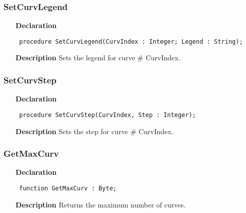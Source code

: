 \documentclass[12pt,a4paper,oneside]{report}
\newcommand{\declarationitem}[1]{\textbf{#1}}
\newcommand{\descriptiontitle}[1]{\textbf{#1}}
\newcommand{\code}[1]{\texttt{#1}}
\begin{document}
\subsubsection{SetCurvLegend}
\label{uwinplot-SetCurvLegend}
\begin{itemize}\item[\declarationitem{Declaration}\hfill]
	\begin{flushleft}
		\code{
			procedure SetCurvLegend(CurvIndex : Integer; Legend : String);}
		
	\end{flushleft}
	
	\par
	\item[\descriptiontitle{Description}]
	Sets the legend for curve {\#} CurvIndex.
	
\end{itemize}
\subsubsection{SetCurvStep}
\label{uwinplot-SetCurvStep}
\begin{itemize}\item[\declarationitem{Declaration}\hfill]
	\begin{flushleft}
		\code{
			procedure SetCurvStep(CurvIndex, Step : Integer);}
		
	\end{flushleft}
	
	\par
	\item[\descriptiontitle{Description}]
	Sets the step for curve {\#} CurvIndex.
	
\end{itemize}
\subsubsection{GetMaxCurv}
\label{uwinplot-GetMaxCurv}
\begin{itemize}\item[\declarationitem{Declaration}\hfill]
	\begin{flushleft}
		\code{
			function GetMaxCurv : Byte;}
		
	\end{flushleft}
	
	\par
	\item[\descriptiontitle{Description}]
	Returns the maximum number of curves.
	
\end{itemize}
\end{document}
